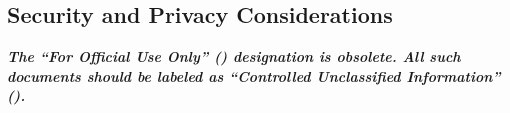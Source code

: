 \subsection{Security and Privacy Considerations}
\label{loc:DocOverview_CUI}

{\bf \em The ``For Official Use Only'' (\FOUO) designation is obsolete.
All such documents should be labeled as ``Controlled Unclassified Information'' (\CUI).}


